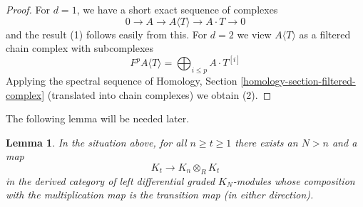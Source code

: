 \documentclass{stacks-project}
\theoremstyle{plain}
\newtheorem{lemma}[subsection]{Lemma}
\theoremstyle{definition}
\theoremstyle{remark}
\numberwithin{equation}{subsection}
\begin{document}
\begin{proof}
For $d = 1$, we have a short exact sequence of complexes
$$
0 \to A \to A\langle T \rangle \to A \cdot T \to 0
$$
and the result (1) follows easily from this. For $d = 2$ we view
$A\langle T \rangle$ as a filtered chain complex with subcomplexes
$$
F^pA\langle T \rangle = \bigoplus\nolimits_{i \leq p} A \cdot T^{[i]}
$$
Applying the spectral sequence of
Homology, Section \ref{homology-section-filtered-complex}
(translated into chain complexes) we obtain (2).
\end{proof}

\noindent
The following lemma will be needed later.

\begin{lemma}
\label{lemma-construct-some-maps}
In the situation above, for all $n \geq t \geq 1$ there exists an $N > n$
and a map
$$
K_t \longrightarrow K_n \otimes_R K_t
$$
in the derived category of left differential graded $K_N$-modules
whose composition with the multiplication map is the transition map
(in either direction).
\end{lemma}
\end{document}
